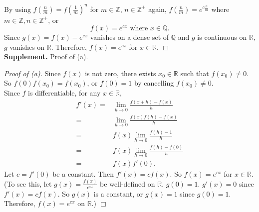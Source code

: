 \documentclass{article}
\begin{document}
By using
$f(\frac{n}{m}) = f(\frac{1}{m})^n$ for $m \in \mathbb{Z}$, $n \in \mathbb{Z}^{+}$ again,
$f(\frac{n}{m}) = e^{c \frac{n}{m}}$ where $m \in \mathbb{Z}, n \in \mathbb{Z}^{+}$, or
$$f(x) = e^{cx} \text{ where } x \in \mathbb{Q}.$$
Since $g(x) = f(x) - e^{cx}$ vanishes on a dense set of $\mathbb{Q}$
and $g$ is continuous on $\mathbb{R}$, $g$ vanishes on $\mathbb{R}$.
Therefore, $f(x) = e^{cx}$ for $x \in \mathbb{R}$.
$\Box$ \\



\textbf{Supplement.} Proof of (a).

\emph{Proof of (a).}
Since $f(x)$ is not zero, there exists $x_0 \in \mathbb{R}$ such that $f(x_0) \neq 0$.
So $f(0)f(x_0) = f(x_0)$, or $f(0) = 1$ by cancelling $f(x_0) \neq 0$. \\

Since $f$ is differentiable, for any $x \in \mathbb{R}$,
\begin{align*}
f'(x)
=& \lim_{h \rightarrow 0} \frac{f(x + h) - f(x)}{h} \\
=& \lim_{h \rightarrow 0} \frac{f(x)f(h) - f(x)}{h} \\
=& f(x) \lim_{h \rightarrow 0} \frac{f(h) - 1}{h} \\
=& f(x) \lim_{h \rightarrow 0} \frac{f(h) - f(0)}{h} \\
=& f(x) f'(0).
\end{align*}
Let $c = f'(0)$ be a constant. Then $f'(x) = c f(x)$. So $f(x) = e^{cx}$ for $x \in \mathbb{R}$.
(To see this, let $g(x) = \frac{f(x)}{e^{cx}}$ be well-defined on $\mathbb{R}$. $g(0) = 1$.
$g'(x) = 0$ since $f'(x) = c f(x)$. So $g(x)$ is a constant, or $g(x) = 1$ since $g(0) = 1$.
Therefore, $f(x) = e^{cx}$ on $\mathbb{R}$.)
$\Box$ \\
\end{document}
